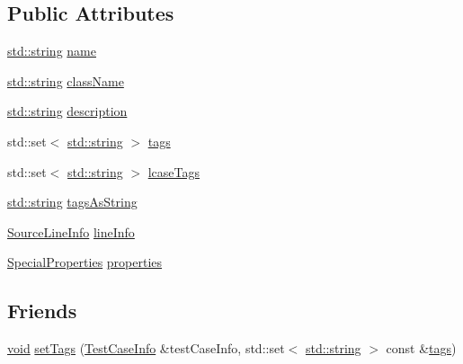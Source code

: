 \subsection*{Public Attributes}
\begin{DoxyCompactItemize}
\item 
\hyperlink{_s_d_l__opengl__glext_8h_ae84541b4f3d8e1ea24ec0f466a8c568b}{std\+::string} \hyperlink{struct_catch_1_1_test_case_info_a463794e2f5cfead307c93efd134ade36}{name}
\item 
\hyperlink{_s_d_l__opengl__glext_8h_ae84541b4f3d8e1ea24ec0f466a8c568b}{std\+::string} \hyperlink{struct_catch_1_1_test_case_info_a1a5e0825132a38d091defdebbf2f8ce9}{class\+Name}
\item 
\hyperlink{_s_d_l__opengl__glext_8h_ae84541b4f3d8e1ea24ec0f466a8c568b}{std\+::string} \hyperlink{struct_catch_1_1_test_case_info_a37fe2db9425bc45f6a33893eac31198e}{description}
\item 
std\+::set$<$ \hyperlink{_s_d_l__opengl__glext_8h_ae84541b4f3d8e1ea24ec0f466a8c568b}{std\+::string} $>$ \hyperlink{struct_catch_1_1_test_case_info_a045f62e7719a8760a5b456f7fd2dc97c}{tags}
\item 
std\+::set$<$ \hyperlink{_s_d_l__opengl__glext_8h_ae84541b4f3d8e1ea24ec0f466a8c568b}{std\+::string} $>$ \hyperlink{struct_catch_1_1_test_case_info_a0ed3864a313e8ddc3ae38431be5be9ae}{lcase\+Tags}
\item 
\hyperlink{_s_d_l__opengl__glext_8h_ae84541b4f3d8e1ea24ec0f466a8c568b}{std\+::string} \hyperlink{struct_catch_1_1_test_case_info_ac65c2d36fd36f71e9bf782b2ea245c64}{tags\+As\+String}
\item 
\hyperlink{struct_catch_1_1_source_line_info}{Source\+Line\+Info} \hyperlink{struct_catch_1_1_test_case_info_aa9407b7f442655b51a2aad24b3fa2fd3}{line\+Info}
\item 
\hyperlink{struct_catch_1_1_test_case_info_a39b232f74b4a7a6f2183b96759027eac}{Special\+Properties} \hyperlink{struct_catch_1_1_test_case_info_afc1e84bd7a2e180895a06d9131302af0}{properties}
\end{DoxyCompactItemize}
\subsection*{Friends}
\begin{DoxyCompactItemize}
\item 
\hyperlink{_s_d_l__opengles2__gl2ext_8h_ae5d8fa23ad07c48bb609509eae494c95}{void} \hyperlink{struct_catch_1_1_test_case_info_addc10c770e56f49da5baa0c76cf25bd5}{set\+Tags} (\hyperlink{struct_catch_1_1_test_case_info}{Test\+Case\+Info} \&test\+Case\+Info, std\+::set$<$ \hyperlink{_s_d_l__opengl__glext_8h_ae84541b4f3d8e1ea24ec0f466a8c568b}{std\+::string} $>$ const \&\hyperlink{struct_catch_1_1_test_case_info_a045f62e7719a8760a5b456f7fd2dc97c}{tags})
\end{DoxyCompactItemize}


